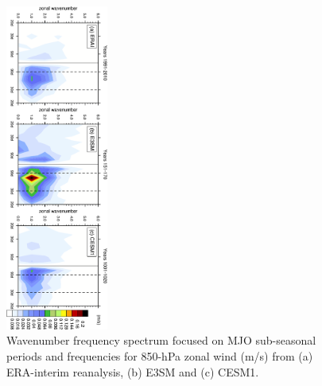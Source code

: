 \documentclass[draft,ms]{AGUTeX}
\begin{document}
\begin{article}
\begin{figure}[t]
  \begin{center}
    \noindent\includegraphics[width=0.3\textwidth,angle=90.]{./figs/f_mjo_spectra_U850_djf.pdf}
  \end{center}
  \caption{Wavenumber frequency spectrum focused on MJO sub-seasonal periods and frequencies for 850-hPa zonal wind (m/s) from (a) ERA-interim reanalysis, (b) E3SM and (c) CESM1.} 
\label{f_mjo_spectra_U850_djf}
\end{figure}


\end{article}
\end{document}
